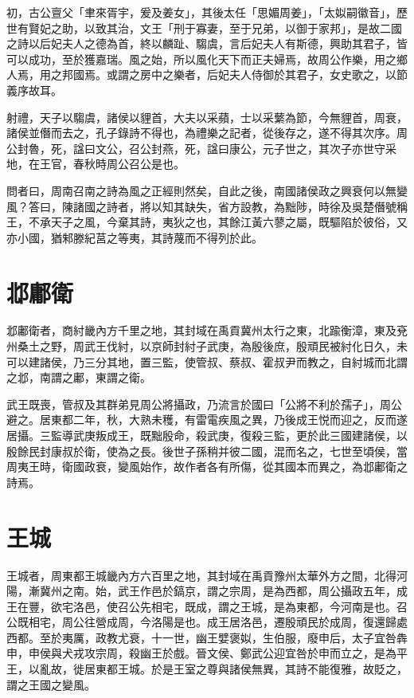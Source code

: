 初，古公亶父「聿來胥宇，爰及姜女」，其後太任「思媚周姜」，「太姒嗣徽音」，歷世有賢妃之助，以致其治，文王「刑于寡妻，至于兄弟，以御于家邦」，是故二國之詩以后妃夫人之德為首，終以麟趾、騶虞，言后妃夫人有斯德，興助其君子，皆可以成功，至於獲嘉瑞。風之始，所以風化天下而正夫婦焉，故周公作樂，用之鄉人焉，用之邦國焉。或謂之房中之樂者，后妃夫人侍御於其君子，女史歌之，以節義序故耳。

射禮，天子以騶虞，諸侯以貍首，大夫以采蘋，士以采蘩為節，今無貍首，周衰，諸侯並僭而去之，孔子錄詩不得也，為禮樂之記者，從後存之，遂不得其次序。周公封魯，死，諡曰文公，召公封燕，死，諡曰康公，元子世之，其次子亦世守采地，在王官，春秋時周公召公是也。

問者曰，周南召南之詩為風之正經則然矣，自此之後，南國諸侯政之興衰何以無變風？答曰，陳諸國之詩者，將以知其缺失，省方設教，為黜陟，時徐及吳楚僭號稱王，不承天子之風，今棄其詩，夷狄之也，其餘江黃六蓼之屬，既驅陷於彼俗，又亦小國，猶邾滕紀莒之等夷，其詩蔑而不得列於此。

\section*{邶鄘衛}

邶鄘衛者，商紂畿內方千里之地，其封域在禹貢冀州太行之東，北踰衡漳，東及兗州桑土之野，周武王伐紂，以京師封紂子武庚，為殷後庶，殷頑民被紂化日久，未可以建諸侯，乃三分其地，置三監，使管叔、蔡叔、霍叔尹而教之，自紂城而北謂之邶，南謂之鄘，東謂之衛。

武王既喪，管叔及其群弟見周公將攝政，乃流言於國曰「公將不利於孺子」，周公避之。居東都二年，秋，大熟未穫，有雷電疾風之異，乃後成王悦而迎之，反而遂居攝。三監導武庚叛成王，既黜殷命，殺武庚，復殺三監，更於此三國建諸侯，以殷餘民封康叔於衛，使為之長。後世子孫稍并彼二國，混而名之，七世至頃侯，當周夷王時，衛國政衰，變風始作，故作者各有所傷，從其國本而異之，為邶鄘衛之詩焉。

\section*{王城}

王城者，周東都王城畿內方六百里之地，其封域在禹貢豫州太華外方之間，北得河陽，漸冀州之南。始，武王作邑於鎬京，謂之宗周，是為西都，周公攝政五年，成王在豐，欲宅洛邑，使召公先相宅，既成，謂之王城，是為東都，今河南是也。召公既相宅，周公往營成周，今洛陽是也。成王居洛邑，遷殷頑民於成周，復還歸處西都。至於夷厲，政教尤衰，十一世，幽王嬖褒姒，生伯服，廢申后，太子宜咎犇申，申侯與犬戎攻宗周，殺幽王於戲。晉文侯、鄭武公迎宜咎於申而立之，是為平王，以亂故，徙居東都王城。於是王室之尊與諸侯無異，其詩不能復雅，故貶之，謂之王國之變風。

